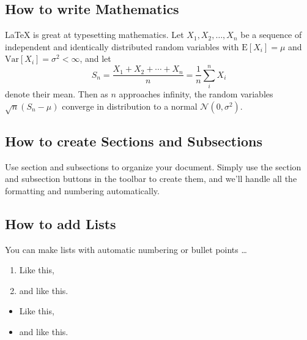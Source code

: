 \documentclass[a4paper]{article}
\begin{document}
\subsection{How to write Mathematics}

\LaTeX{} is great at typesetting mathematics. Let $X_1, X_2, \ldots, X_n$ be a sequence of independent and identically distributed random variables with $\text{E}[X_i] = \mu$ and $\text{Var}[X_i] = \sigma^2 < \infty$, and let
\[S_n = \frac{X_1 + X_2 + \cdots + X_n}{n}
      = \frac{1}{n}\sum_{i}^{n} X_i\]
denote their mean. Then as $n$ approaches infinity, the random variables $\sqrt{n}(S_n - \mu)$ converge in distribution to a normal $\mathcal{N}(0, \sigma^2)$.


\subsection{How to create Sections and Subsections}

Use section and subsections to organize your document. Simply use the section and subsection buttons in the toolbar to create them, and we'll handle all the formatting and numbering automatically.

\subsection{How to add Lists}

You can make lists with automatic numbering  or bullet points \dots

\begin{enumerate}
\item Like this,
\item and like this.
\end{enumerate}

\begin{itemize}
\item Like this,
\item and like this.
\end{itemize}






%
%
\end{document}
